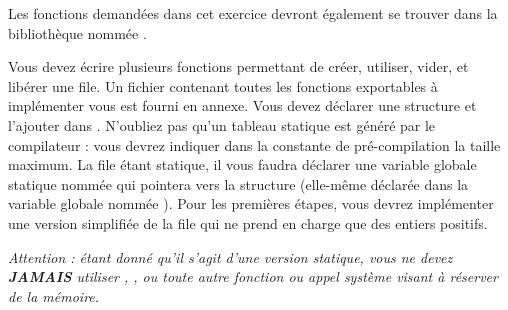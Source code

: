 

\vspace*{0.7cm}

\noindent {}

\bigskip

\noindent Les fonctions demandées dans cet exercice devront également se trouver dans la bibliothèque nommée .

\bigskip

\noindent Vous devez écrire plusieurs fonctions permettant de créer, utiliser, vider, et libérer une file.
Un fichier  contenant toutes les fonctions exportables à implémenter vous est fourni en annexe.
Vous devez déclarer une structure  et l'ajouter dans .
N'oubliez pas qu'un tableau statique est généré par le compilateur : vous devrez indiquer dans la constante de pré-compilation  la taille maximum.
La file étant statique, il vous faudra déclarer une variable globale statique nommée  qui pointera vers la structure (elle-même déclarée dans la variable globale nommée ).
Pour les premières étapes, vous devrez implémenter une version simplifiée de la file qui ne prend en charge que des entiers positifs.

\noindent \textit{Attention : étant donné qu'il s'agit d'une version statique, vous ne devez \textbf{JAMAIS} utiliser , , ou toute autre fonction ou appel système visant à réserver de la mémoire.}

